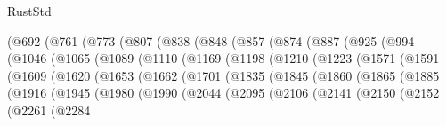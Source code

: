 \begin{lexlean}{RustStd}
\begin{coremodule}
            (@692
              (@761
                (@773
                  (@807
                    (@838
                      (@848
                        (@857
                          (@874
                            (@887
                              (@925
                                (@994
                                  (@1046
                                    (@1065
                                      (@1089
                                        (@1110
                                          (@1169
                                            (@1198
                                              (@1210
                                                (@1223
                                                  (@1571
                                                    (@1591
                                                      (@1609
                                                        (@1620
                                                          (@1653
                                                            (@1662
                                                              (@1701
                                                                (@1835
                                                                  (@1845
                                                                    (@1860
                                                                      (@1865
                                                                        (@1885
                                                                          (@1916
                                                                            (@1945
                                                                              (@1980
                                                                                (@1990
                                                                                  (@2044
                                                                                    (@2095
                                                                                      (@2106
                                                                                        (@2141
                                                                                          (@2150
                                                                                            (@2152
                                                                                              (@2261
                                                                                                (@2284

\end{coremodule}
\end{lexlean}
